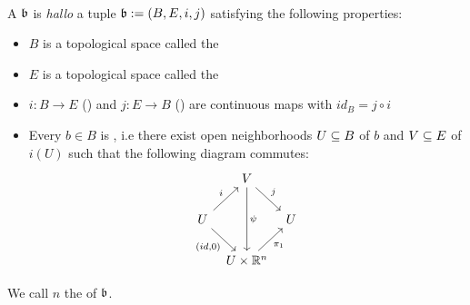 \\
A  $\mathfrak{b}$ is \emph{hallo} a tuple $\mathfrak{b} := (B, E, i, j)$ satisfying the following properties:
\begin{itemize}
    \item $B$ is a topological space called the 
    \item $E$ is a topological space called the 
    \item $i: B \to E$ () and $j: E \to B$ () are continuous maps with $id_B = j \circ i$
    \item Every $b \in B$ is , i.e there exist open neighborhoods $U \subseteq B$ of $b$ and $V \subseteq E$ of $i(U)$ such that the following diagram commutes:
    \[\begin{tikzcd}[column sep=tiny]
        & V \ar[dr, "j"] \ar[dd, "\psi"] & \\
        U \ar[ur, "i"] \ar[dr, "{(id, 0)}"'] & & U \\
        & U \times\R^n \ar[ur, "\pi_1"'] &
    \end{tikzcd}\]
\end{itemize}
We call $n$ the  of $\mathfrak{b}$.